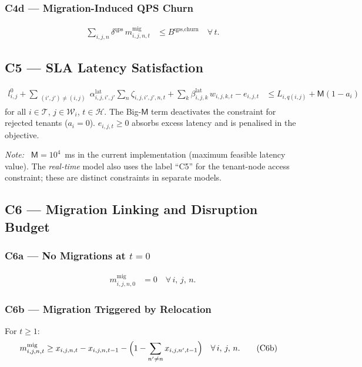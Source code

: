 \documentclass[11pt,a4paper]{article}
\newcommand{\cT}{\mathcal{T}}           %
\newcommand{\cW}{\mathcal{W}}           %
\newcommand{\cH}{\mathcal{H}}           %
\newcommand{\BigM}{\mathsf{M}}          %
\newenvironment{note}{\smallskip\noindent\textcolor{notegrey}{\textit{Note:\ }}}{\smallskip}
\begin{document}
\subsubsection*{C4d --- Migration-Induced QPS Churn}
\begin{align}
  \sum_{i,j,n} \delta^{\text{qps}}\,m_{i,j,n,t}^{\text{mig}}
  &\le B^{\text{qps,churn}}
  \quad \forall\,t.
  \tag{C4d}
\end{align}

\subsection{C5 --- SLA Latency Satisfaction}
\label{c5}

\begin{align}
  l^0_{i,j}
  + \sum_{\substack{(i',j')\ne(i,j)}} \alpha_{i,j,i',j'}^{\text{lat}}
    \sum_n \zeta_{i,j,i',j',n,t}
  + \sum_k \beta_{i,j,k}^{\text{lat}}\,w_{i,j,k,t}
  - e_{i,j,t}
  &\le L_{i,q(i,j)} + \BigM(1-a_i)
  \tag{C5}
\end{align}
for all $i\in\cT$, $j\in\cW_i$, $t\in\cH$.  The Big-$\BigM$ term
deactivates the constraint for rejected tenants ($a_i=0$).  $e_{i,j,t}\ge 0$
absorbs excess latency and is penalised in the objective.

\begin{note}
  $\BigM = 10^4$~ms in the current implementation (maximum feasible latency
  value).  The \emph{real-time} model also uses the label ``C5'' for the
  tenant-node access constraint; these are distinct constraints in separate
  models.
\end{note}

\subsection{C6 --- Migration Linking and Disruption Budget}

\subsubsection*{C6a --- No Migrations at $t=0$}
\begin{align}
  m_{i,j,n,0}^{\text{mig}} &= 0
  \quad \forall\,i,\,j,\,n.
  \tag{C6a}
\end{align}

\subsubsection*{C6b --- Migration Triggered by Relocation}
For $t\ge 1$:
\begin{align}
  m_{i,j,n,t}^{\text{mig}}
  &\ge x_{i,j,n,t} - x_{i,j,n,t-1}
    - \Bigl(1 - \sum_{n'\ne n} x_{i,j,n',t-1}\Bigr)
  \quad \forall\,i,\,j,\,n.
  \tag{C6b}
\end{align}
\end{document}
